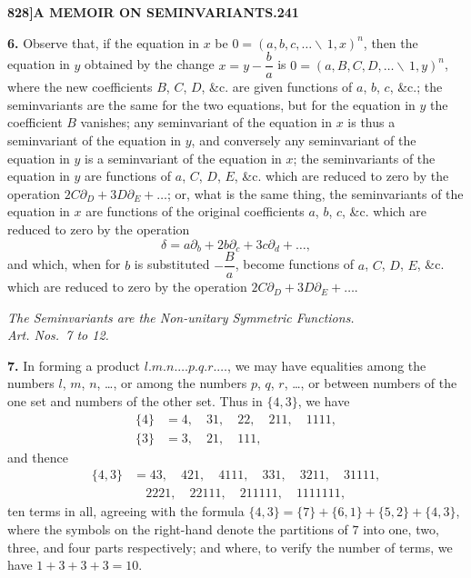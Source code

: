 \documentclass[12pt,a4paper]{article}
\theoremstyle{definition}
\begin{document}
\newpage
\setcounter{page}{241}

\noindent\textbf{828]}\hfill\textbf{A MEMOIR ON SEMINVARIANTS.}\hfill\textbf{241}

\bigskip

\noindent\textbf{6.} Observe that, if the equation in $x$ be $0 = (a, b, c, \dots \!\!\!\backslash\, 1, x)^n$, then the equation in $y$ obtained by the change $x = y - \dfrac{b}{a}$ is $0 = (a, B, C, D, \dots \!\!\!\backslash\, 1, y)^n$, where the new coefficients $B$, $C$, $D$, \&c. are given functions of $a$, $b$, $c$, \&c.; the seminvariants are the same for the two equations, but for the equation in $y$ the coefficient $B$ vanishes; any seminvariant of the equation in $x$ is thus a seminvariant of the equation in $y$, and conversely any seminvariant of the equation in $y$ is a seminvariant of the equation in $x$; the seminvariants of the equation in $y$ are functions of $a$, $C$, $D$, $E$, \&c. which are reduced to zero by the operation $2C\partial_D + 3D\partial_E + \dots$; or, what is the same thing, the seminvariants of the equation in $x$ are functions of the original coefficients $a$, $b$, $c$, \&c. which are reduced to zero by the operation
\[
\delta = a\partial_b + 2b\partial_c + 3c\partial_d + \dots,
\]
and which, when for $b$ is substituted $-\dfrac{B}{a}$, become functions of $a$, $C$, $D$, $E$, \&c. which are reduced to zero by the operation $2C\partial_D + 3D\partial_E + \dots$.

\begin{center}
\textit{The Seminvariants are the Non-unitary Symmetric Functions.}\\
\textit{Art. Nos.~7 to 12.}
\end{center}

\noindent\textbf{7.} In forming a product $l.m.n.\dots p.q.r.\dots$, we may have equalities among the numbers $l$, $m$, $n$, \dots, or among the numbers $p$, $q$, $r$, \dots, or between numbers of the one set and numbers of the other set. Thus in $\{4, 3\}$, we have
\begin{align*}
\{4\} &= 4, \quad 31, \quad 22, \quad 211, \quad 1111, \\
\{3\} &= 3, \quad 21, \quad 111,
\end{align*}
and thence
\begin{align*}
\{4, 3\} &= 43, \quad 421, \quad 4111, \quad 331, \quad 3211, \quad 31111, \\
&\quad 2221, \quad 22111, \quad 211111, \quad 1111111,
\end{align*}
ten terms in all, agreeing with the formula $\{4, 3\} = \{7\} + \{6, 1\} + \{5, 2\} + \{4, 3\}$, where the symbols on the right-hand denote the partitions of $7$ into one, two, three, and four parts respectively; and where, to verify the number of terms, we have $1 + 3 + 3 + 3 = 10$.
\end{document}
